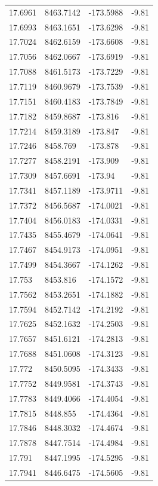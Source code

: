 \begin{table}[H]
\begin{tabular}{llll}
17.6961 & 8463.7142 & -173.5988 & -9.81 \\
17.6993 & 8463.1651 & -173.6298 & -9.81 \\
17.7024 & 8462.6159 & -173.6608 & -9.81 \\
17.7056 & 8462.0667 & -173.6919 & -9.81 \\
17.7088 & 8461.5173 & -173.7229 & -9.81 \\
17.7119 & 8460.9679 & -173.7539 & -9.81 \\
17.7151 & 8460.4183 & -173.7849 & -9.81 \\
17.7182 & 8459.8687 & -173.816 & -9.81 \\
17.7214 & 8459.3189 & -173.847 & -9.81 \\
17.7246 & 8458.769 & -173.878 & -9.81 \\
17.7277 & 8458.2191 & -173.909 & -9.81 \\
17.7309 & 8457.6691 & -173.94 & -9.81 \\
17.7341 & 8457.1189 & -173.9711 & -9.81 \\
17.7372 & 8456.5687 & -174.0021 & -9.81 \\
17.7404 & 8456.0183 & -174.0331 & -9.81 \\
17.7435 & 8455.4679 & -174.0641 & -9.81 \\
17.7467 & 8454.9173 & -174.0951 & -9.81 \\
17.7499 & 8454.3667 & -174.1262 & -9.81 \\
17.753 & 8453.816 & -174.1572 & -9.81 \\
17.7562 & 8453.2651 & -174.1882 & -9.81 \\
17.7594 & 8452.7142 & -174.2192 & -9.81 \\
17.7625 & 8452.1632 & -174.2503 & -9.81 \\
17.7657 & 8451.6121 & -174.2813 & -9.81 \\
17.7688 & 8451.0608 & -174.3123 & -9.81 \\
17.772 & 8450.5095 & -174.3433 & -9.81 \\
17.7752 & 8449.9581 & -174.3743 & -9.81 \\
17.7783 & 8449.4066 & -174.4054 & -9.81 \\
17.7815 & 8448.855 & -174.4364 & -9.81 \\
17.7846 & 8448.3032 & -174.4674 & -9.81 \\
17.7878 & 8447.7514 & -174.4984 & -9.81 \\
17.791 & 8447.1995 & -174.5295 & -9.81 \\
17.7941 & 8446.6475 & -174.5605 & -9.81 \\

\end{tabular}
\end{table}
